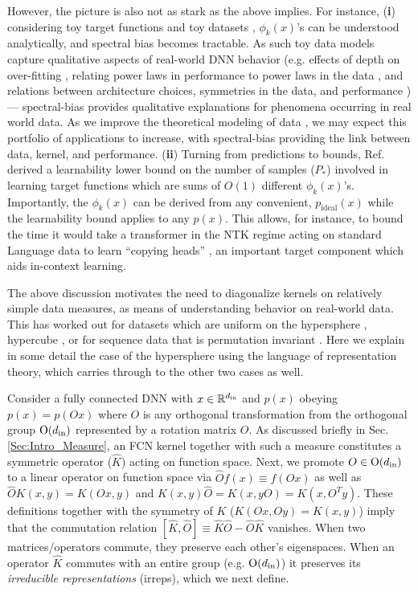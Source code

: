 However, the picture is also not as stark as the above implies. For instance, ({\bf i}) considering toy target functions and toy datasets \citep{cohen2021learning,Canatar2021,lavie2024towards,yang2019fine}, $\phi_k(x)$'s can be understood analytically, and spectral bias becomes tractable. As such toy data models capture qualitative aspects of real-world DNN behavior (e.g. effects of depth on over-fitting \citep{yang2019fine}, relating power laws in performance to power laws in the data \citep{Bahri2024Explaining}, and relations between architecture choices, symmetries in the data, and performance \citep{novak2018bayesian})--- spectral-bias provides qualitative explanations for phenomena occurring in real world data. As we improve the theoretical modeling of data \citep{Francesco2024}, we may expect this portfolio of applications to increase, with spectral-bias providing the link between data, kernel, and performance.  ({\bf ii}) Turning from predictions to bounds, Ref. \cite{lavie2024symmetric} derived a learnability lower bound on the number of samples ($P_*$) involved in learning target functions which are sums of $O(1)$ different $\phi_k(x)$'s. Importantly, the $\phi_k(x)$ can be derived from any convenient, $p_{\text{ideal}}(x)$ while the learnability bound applies to any $p(x)$. This allows, for instance, to bound the time it would take a transformer in the NTK regime acting on standard Language data to learn ``copying heads'' \citep{olsson2022context}, an important target component which aids in-context learning. 

The above discussion motivates the need to diagonalize kernels on relatively simple data measures, as means of understanding behavior on real-world data. This has worked out for datasets which are uniform on the hypersphere \citep{Azevedo2015EigenvaluesOD}, hypercube \citep{yang2019fine}, or for sequence data that is permutation invariant \citep{lavie2024towards}. Here we explain in some detail the case of the hypersphere using the language of representation theory, which carries through to the other two cases as well. 

Consider a fully connected DNN with $x \in \mathbb{R}^{d_{\text{in}}}$ and $p(x)$ obeying $p(x)=p(Ox)$ where $O$ is any orthogonal transformation from the orthogonal group ${\rm O}(d_{\text{in}})$ represented by a rotation matrix $O$. As discussed briefly in Sec. \ref{Sec:Intro_Measure}, an FCN kernel together with such a measure constitutes a symmetric operator ($\hat{K}$) acting on function space. Next, we promote $O \in {\rm O}(d_{\text{in}})$ to a linear operator on function space via $\hat{O} f(x)\equiv f(Ox)$ as well as $\hat{O} K(x,y)=K(Ox,y)$ and $K(x,y)\hat{O}=K(x,yO)=K(x,O^T y)$. These definitions together with the symmetry of $K$ ($K(Ox,Oy)=K(x,y)$) imply that the commutation relation $[\hat{K},\hat{O}]\equiv \hat{K}\hat{O}-\hat{O}\hat{K}$ vanishes. When two matrices/operators commute, they preserve each other's eigenspaces. When an operator $\hat{K}$ commutes with an entire group (e.g. ${\rm O}(d_{\text{in}})$) it preserves its {\it irreducible representations} (irreps), which we next define. 

